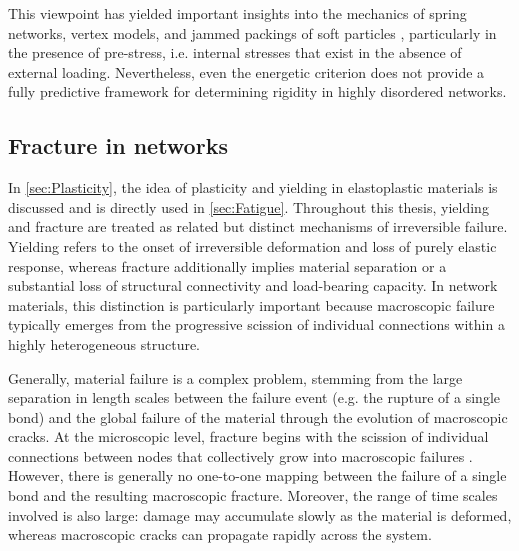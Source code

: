 \documentclass[asymmetricmargins]{library/duthesis}%
\begin{document}
This viewpoint has yielded important insights into the mechanics of spring networks, vertex models, and jammed packings of soft particles \cite{damavandi_energetic_2022-1}, particularly in the presence of pre-stress, i.e. internal stresses that exist in the absence of external loading. Nevertheless, even the energetic criterion does not provide a fully predictive framework for determining rigidity in highly disordered networks.

\subsection{Fracture in networks}\label{sec:Fracture}
In \cref{sec:Plasticity}, the idea of plasticity and yielding in elastoplastic materials is discussed and is directly used in \cref{sec:Fatigue}. Throughout this thesis, yielding and fracture are treated as related but distinct mechanisms of irreversible failure. Yielding refers to the onset of irreversible deformation and loss of purely elastic response, whereas fracture additionally implies material separation or a substantial loss of structural connectivity and load-bearing capacity. In network materials, this distinction is particularly important because macroscopic failure typically emerges from the progressive scission of individual connections within a highly heterogeneous structure.

Generally, material failure is a complex problem, stemming from the large separation in length scales between the failure event (e.g. the rupture of a single bond) and the global failure of the material through the evolution of macroscopic cracks. At the microscopic level, fracture begins with the scission of individual connections between nodes that collectively grow into macroscopic failures \cite{Creton50th2017,ju_role_nodate,sanner_less_2025,higuchi_fracture_2018,bonnDelayedFractureInhomogeneous1998,teece_gels_2014}. However, there is generally no one-to-one mapping between the failure of a single bond and the resulting macroscopic fracture. Moreover, the range of time scales involved is also large: damage may accumulate slowly as the material is deformed, whereas macroscopic cracks can propagate rapidly across the system.
\end{document}
